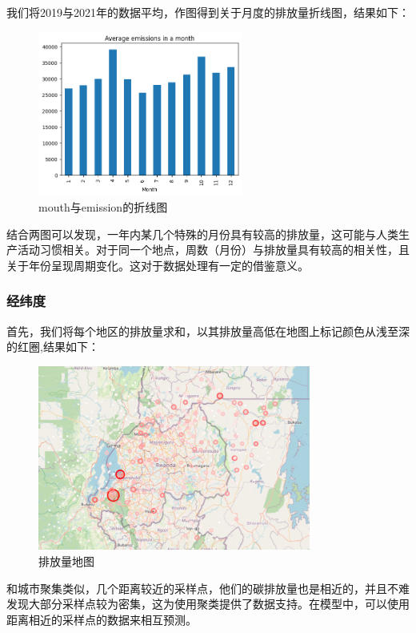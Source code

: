 \documentclass{ctexart}
\begin{document}
我们将2019与2021年的数据平均，作图得到关于月度的排放量折线图，结果如下：

\begin{figure}[H]
      \centering
      \includegraphics[width=0.6\textwidth]{output3.png}
      \caption{mouth与emission的折线图}
\end{figure}

结合两图可以发现，一年内某几个特殊的月份具有较高的排放量，这可能与人类生产活动习惯相关。对于同一个地点，周数（月份）与排放量具有较高的相关性，且关于年份呈现周期变化。这对于数据处理有一定的借鉴意义。

\subsubsection{经纬度}

首先，我们将每个地区的排放量求和，以其排放量高低在地图上标记颜色从浅至深的红圈,结果如下：

\begin{figure}[H]
      \centering
      \includegraphics[width=0.8\textwidth]{output4.png}
      \caption{排放量地图}
\end{figure}

和城市聚集类似，几个距离较近的采样点，他们的碳排放量也是相近的，并且不难发现大部分采样点较为密集，这为使用聚类提供了数据支持。在模型中，可以使用距离相近的采样点的数据来相互预测。
\end{document}
